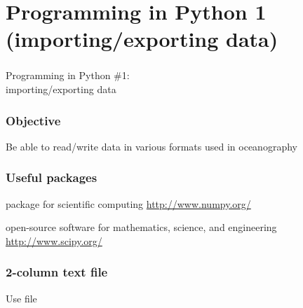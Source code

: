 \section{Programming in Python 1 (importing/exporting data)}

\begin{frame}
\frametitle{}
\huge
Programming in Python \#1:\\
importing/exporting data

\end{frame}

\begin{frame}
\frametitle{Objective}

Be able to read/write data in various formats used in oceanography

\vfill 


\end{frame}

\begin{frame}
\frametitle{Useful packages}

\begin{description}
\item<1->[NumPy:] package for scientific computing \url{http://www.numpy.org/}
\item<2->[SciPy:] open-source software for mathematics, science, and engineering \url{http://www.scipy.org/}

\end{description}
\end{frame}

\begin{frame}[fragile]
\frametitle{2-column text file}
Use file 



\end{frame}

\begin{frame}
\frametitle{}

\end{frame}

\begin{frame}
\frametitle{}

\end{frame}


